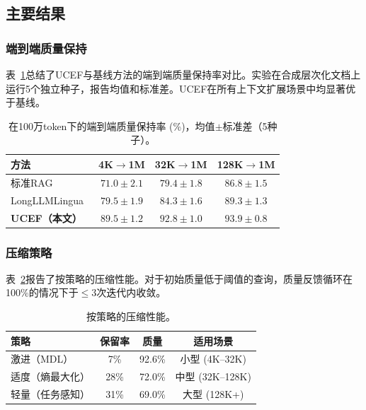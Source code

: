 \documentclass[a4paper,11pt]{ctexart}
\newcommand{\ucef}{\textsf{UCEF}}
\begin{document}
\subsection{主要结果}

\subsubsection{端到端质量保持}

表~\ref{tab:e2e}总结了\ucef{}与基线方法的端到端质量保持率对比。实验在合成层次化文档上运行5个独立种子，报告均值和标准差。\ucef{}在所有上下文扩展场景中均显著优于基线。

\begin{table}[t]
\centering
\caption{在100万token下的端到端质量保持率 (\%)，均值$\pm$标准差（5种子）。}
\label{tab:e2e}
\small
\begin{tabular}{@{}lccc@{}}
\toprule
方法 & 4K$\to$1M & 32K$\to$1M & 128K$\to$1M \\
\midrule
标准RAG   & $71.0\pm2.1$ & $79.4\pm1.8$ & $86.8\pm1.5$ \\
LongLLMLingua~\cite{jiang2024longllmlingua}  & $79.5\pm1.9$ & $84.3\pm1.6$ & $89.3\pm1.3$ \\
\textbf{\ucef{}（本文）} & $\mathbf{89.5\pm1.2}$ & $\mathbf{92.8\pm1.0}$ & $\mathbf{93.9\pm0.8}$ \\
\bottomrule
\end{tabular}
\end{table}

\subsubsection{压缩策略}

表~\ref{tab:compression}报告了按策略的压缩性能。对于初始质量低于阈值的查询，质量反馈循环在100\%的情况下于$\leq 3$次迭代内收敛。

\begin{table}[t]
\centering
\caption{按策略的压缩性能。}
\label{tab:compression}
\small
\begin{tabular}{@{}lccc@{}}
\toprule
策略   & 保留率 & 质量 & 适用场景 \\
\midrule
激进（MDL） &  7\% & 92.6\% & 小型 (4K--32K) \\
适度（熵最大化）   & 28\% & 72.0\% & 中型 (32K--128K) \\
轻量（任务感知）      & 31\% & 69.0\% & 大型 (128K+) \\
\bottomrule
\end{tabular}
\end{table}
\end{document}
